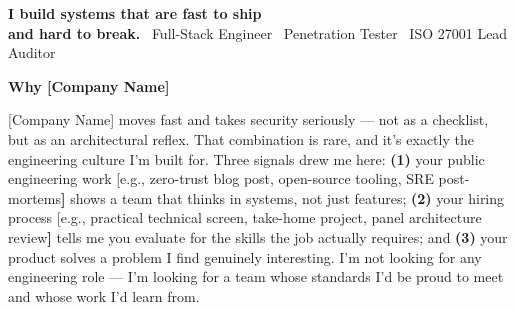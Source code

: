 \documentclass{coverletter}
\begin{document}
\noindent%
\begingroup
  \setlength{\fboxrule}{0pt}%
  \setlength{\fboxsep}{0pt}%
  \colorbox{accent!8}{%
    \parbox{\linewidth}{%
      \vspace{0.35cm}%
      \hspace{0.5cm}%
      \begin{minipage}{\dimexpr\linewidth-1cm}
        {\sffamily\bfseries\LARGE\color{accent!80!primary}
          I build systems that are fast to ship\\
          and hard to break.}
        \vspace{0.08cm}
        \vspace{0.15cm}
        {\sffamily\small\color{muted}
          \faCode\ Full-Stack Engineer\quad
          \faShieldHalved\ Penetration Tester\quad
          \faCertificate\ ISO 27001 Lead Auditor}
        \vspace{0.35cm}
      \end{minipage}%
    }%
  }%
\endgroup

\vspace{0.4cm}

\noindent%
{\raggedright\sffamily\small\color{secondary}
  \llap{\color{accent}\rule[0.12ex]{3pt}{1em}\hspace{0.35em}}\textbf{Why [Company Name]}
}

\vspace{0.05cm}

\noindent%
{\color{secondary}\sffamily\small
  [Company Name] moves fast and takes security seriously — not as a checklist,
  but as an architectural reflex. That combination is rare, and it's exactly the
  engineering culture I'm built for. Three signals drew me here:
  \textbf{(1)} your public engineering work
  {[}e.g., zero-trust blog post, open-source tooling, SRE post-mortems\textbf{]}
  shows a team that thinks in systems, not just features;
  \textbf{(2)} your hiring process
  {[}e.g., practical technical screen, take-home project, panel architecture review\textbf{]}
  tells me you evaluate for the skills the job actually requires;
  and \textbf{(3)} your product solves a problem I find genuinely interesting.
  I'm not looking for any engineering role — I'm looking for a team whose standards
  I'd be proud to meet and whose work I'd learn from.
}
\end{document}
